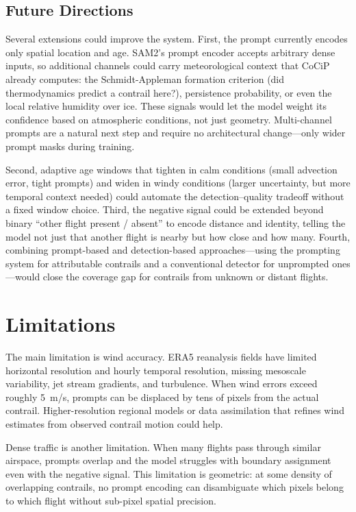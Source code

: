 \documentclass[review]{elsarticle}
\begin{document}
\subsection{Future Directions}

Several extensions could improve the system. First, the prompt currently encodes only spatial location and age. SAM2's prompt encoder accepts arbitrary dense inputs, so additional channels could carry meteorological context that CoCiP already computes: the Schmidt-Appleman formation criterion (did thermodynamics predict a contrail here?), persistence probability, or even the local relative humidity over ice. These signals would let the model weight its confidence based on atmospheric conditions, not just geometry. Multi-channel prompts are a natural next step and require no architectural change---only wider prompt masks during training.

Second, adaptive age windows that tighten in calm conditions (small advection error, tight prompts) and widen in windy conditions (larger uncertainty, but more temporal context needed) could automate the detection--quality tradeoff without a fixed window choice. Third, the negative signal could be extended beyond binary ``other flight present / absent'' to encode distance and identity, telling the model not just that another flight is nearby but how close and how many. Fourth, combining prompt-based and detection-based approaches---using the prompting system for attributable contrails and a conventional detector for unprompted ones---would close the coverage gap for contrails from unknown or distant flights.

\section{Limitations}
\label{sec:limitations}

The main limitation is wind accuracy. ERA5 reanalysis fields have limited horizontal resolution and hourly temporal resolution, missing mesoscale variability, jet stream gradients, and turbulence. When wind errors exceed roughly 5~m/s, prompts can be displaced by tens of pixels from the actual contrail. Higher-resolution regional models or data assimilation that refines wind estimates from observed contrail motion could help.

Dense traffic is another limitation. When many flights pass through similar airspace, prompts overlap and the model struggles with boundary assignment even with the negative signal. This limitation is geometric: at some density of overlapping contrails, no prompt encoding can disambiguate which pixels belong to which flight without sub-pixel spatial precision.
\end{document}

